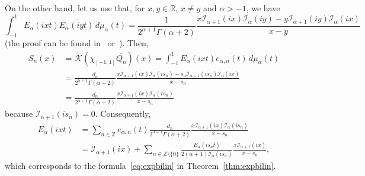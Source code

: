 \documentclass[11pt,a4paper]{amsart}
\theoremstyle{plain}
\theoremstyle{definition}
\newcommand{\Z}{\mathbb{Z}}
\newcommand{\R}{\mathbb{R}}
\newcommand{\calK}{\mathcal{K}}
\newcommand{\calI}{\mathcal{I}}
\begin{document}
On the other hand, let us use that, for $x,y\in \R$, $x \ne  y$ and $\alpha>-1$, we have
\begin{equation}
\label{eq:Lommel-Dunkl}
  \int_{-1}^1 E_{\alpha}(ixt)\overline{E_{\alpha}(iyt)}\, d\mu_{\alpha}(t)
  = \frac{1}{2^{\alpha+1}\Gamma(\alpha+2)}
    \frac{x\calI_{\alpha+1}(ix)\calI_{\alpha}(iy)
      - y\calI_{\alpha+1}(iy)\calI_{\alpha}(ix)}{x-y}
\end{equation}
(the proof can be found in~\cite{BCV} or~\cite{CV}).
Then,
\begin{align*}
  S_{n}(x) &= \widetilde{\calK}(\chi_{[-1,1]}\overline{Q_n})(x)
  = \int_{-1}^1 E_\alpha (ixt) \overline{e_{\alpha,n}(t)} \,d\mu_\alpha(t) \\
  &= \frac{d_n}{2^{\alpha+1}\Gamma(\alpha+2)}
  \frac{x \calI_{\alpha+1}(ix) \calI_{\alpha}(is_n)
    - s_n \calI_{\alpha+1}(is_n) \calI_{\alpha}(ix) }{x-s_n} \\
  &= \frac{d_n}{2^{\alpha+1}\Gamma(\alpha+2)}
  \frac{x \calI_{\alpha+1}(ix) \calI_{\alpha}(is_n)}{x-s_n}
\end{align*}
because $\calI_{\alpha+1}(is_n) = 0$.
Consequently,
\begin{align*}
  E_\alpha(ixt) &= \sum_{n \in \Z} e_{\alpha,n}(t)
  \frac{d_n}{2^{\alpha+1}\Gamma(\alpha+2)}
  \frac{x \calI_{\alpha+1}(ix) \calI_{\alpha}(is_n)}{x-s_n} \\
  &= \calI_{\alpha+1}(ix) + \sum_{n\in\Z \setminus\{0\}}
  \frac{E_{\alpha}(is_nt)}{2(\alpha+1) \calI_{\alpha}(is_n)}
  \frac{x \calI_{\alpha+1}(ix)}{x-s_n},
\end{align*}
which corresponds to the formula~\eqref{eq:expbilin} in Theorem~\ref{thm:expbilin}.
\end{document}
